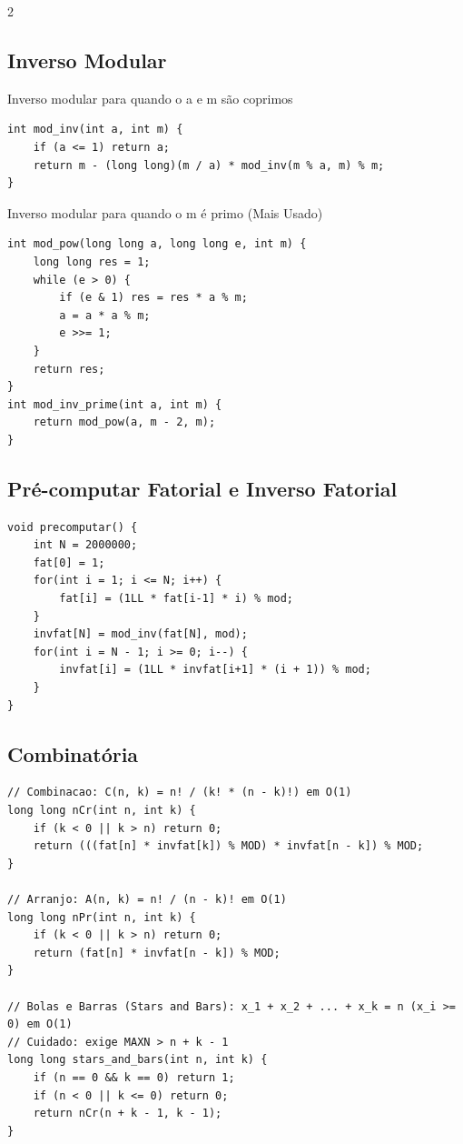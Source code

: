 \documentclass[11pt]{article}
\begin{document}
\begin{multicols}{2}
\subsection{Inverso Modular}
Inverso modular para quando o a e m são coprimos
\begin{lstlisting}
int mod_inv(int a, int m) {
    if (a <= 1) return a;
    return m - (long long)(m / a) * mod_inv(m % a, m) % m;
}
\end{lstlisting}

Inverso modular para quando o m é primo (Mais Usado)
\begin{lstlisting}
int mod_pow(long long a, long long e, int m) {
    long long res = 1;
    while (e > 0) {
        if (e & 1) res = res * a % m;
        a = a * a % m;
        e >>= 1;
    }
    return res;
}
int mod_inv_prime(int a, int m) {
    return mod_pow(a, m - 2, m);
}
\end{lstlisting}

\subsection{Pré-computar Fatorial e Inverso Fatorial}
\begin{lstlisting}
void precomputar() {
    int N = 2000000;
    fat[0] = 1;
    for(int i = 1; i <= N; i++) {
        fat[i] = (1LL * fat[i-1] * i) % mod;
    }
    invfat[N] = mod_inv(fat[N], mod);
    for(int i = N - 1; i >= 0; i--) {
        invfat[i] = (1LL * invfat[i+1] * (i + 1)) % mod;
    }
}
\end{lstlisting}

\subsection{Combinatória}
\begin{lstlisting}
// Combinacao: C(n, k) = n! / (k! * (n - k)!) em O(1)
long long nCr(int n, int k) {
    if (k < 0 || k > n) return 0;
    return (((fat[n] * invfat[k]) % MOD) * invfat[n - k]) % MOD;
}

// Arranjo: A(n, k) = n! / (n - k)! em O(1)
long long nPr(int n, int k) {
    if (k < 0 || k > n) return 0;
    return (fat[n] * invfat[n - k]) % MOD;
}

// Bolas e Barras (Stars and Bars): x_1 + x_2 + ... + x_k = n (x_i >= 0) em O(1)
// Cuidado: exige MAXN > n + k - 1
long long stars_and_bars(int n, int k) {
    if (n == 0 && k == 0) return 1;
    if (n < 0 || k <= 0) return 0;
    return nCr(n + k - 1, k - 1);
}
\end{lstlisting}


\end{multicols}
\end{document}
